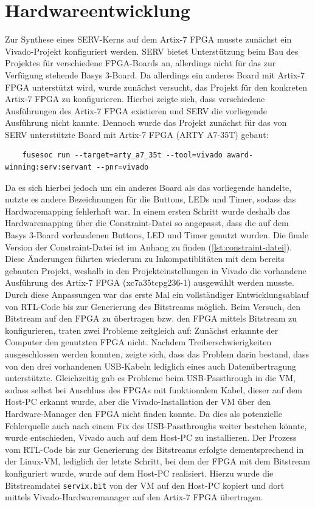 \section{Hardwareentwicklung} \label{sec:hardwareentwicklung}
    Zur Synthese eines SERV-Kerns auf dem Artix-7 FPGA musste zunächst ein Vivado-Projekt konfiguriert werden.
    SERV bietet Unterstützung beim Bau des Projektes für verschiedene FPGA-Boards an, allerdings nicht für das zur Verfügung stehende Basys 3-Board.
    Da allerdings ein anderes Board mit Artix-7 FPGA unterstützt wird, wurde zunächst versucht, das Projekt für den konkreten Artix-7 FPGA zu konfigurieren.
    Hierbei zeigte sich, dass verschiedene Ausführungen des Artix-7 FPGA existieren und SERV die vorliegende Ausführung nicht kannte.
    Dennoch wurde das Projekt zunächst für das von SERV unterstützte Board mit Artix-7 FPGA (ARTY A7-35T) gebaut:
    \begin{verbatim}
    fusesoc run --target=arty_a7_35t --tool=vivado award-winning:serv:servant --pnr=vivado
    \end{verbatim}
    Da es sich hierbei jedoch um ein anderes Board als das vorliegende handelte, nutzte es andere Bezeichnungen für die Buttons, LEDs und Timer, sodass das Hardwaremapping fehlerhaft war.
    In einem ersten Schritt wurde deshalb das Hardwaremapping über die Constraint-Datei so angepasst, dass die auf dem Basys 3-Board vorhandenen Buttons, LED und Timer genutzt wurden.
    Die finale Version der Constraint-Datei ist im Anhang zu finden (\cref{lst:constraint-datei}).
    Diese Änderungen führten wiederum zu Inkompatiblitäten mit dem bereits gebauten Projekt, weshalb in den Projekteinstellungen in Vivado die vorhandene Ausführung des Artix-7 FPGA (xc7a35tcpg236-1) ausgewählt werden musste.
    Durch diese Anpassungen war das erste Mal ein vollständiger Entwicklungsablauf von RTL-Code bis zur Generierung des Bitstreams möglich.
    Beim Versuch, den Bitstream auf den FPGA zu übertragen bzw. den FPGA mittels Bitstream zu konfigurieren, traten zwei Probleme zeitgleich auf:
    Zunächst erkannte der Computer den genutzten FPGA nicht.
    Nachdem Treiberschwierigkeiten ausgeschlossen werden konnten, zeigte sich, dass das Problem darin bestand, dass von den drei vorhandenen USB-Kabeln lediglich eines auch Datenübertragung unterstützte.
    Gleichzeitig gab es Probleme beim USB-Passthrough in die VM, sodass selbst bei Anschluss des FPGAs mit funktionalem Kabel, dieser auf dem Host-PC erkannt wurde, aber die Vivado-Installation der VM über den Hardware-Manager den FPGA nicht finden konnte.
    Da dies als potenzielle Fehlerquelle auch nach einem Fix des USB-Passthroughs weiter bestehen könnte, wurde entschieden, Vivado auch auf dem Host-PC zu installieren.
    Der Prozess vom RTL-Code bis zur Generierung des Bitstreams erfolgte dementsprechend in der Linux-VM, lediglich der letzte Schritt, bei dem der FPGA mit dem Bitstream konfiguriert wurde, wurde auf dem Host-PC realisiert.
    Hierzu wurde die Bitstreamdatei \verb|servix.bit| von der VM auf den Host-PC kopiert und dort mittels Vivado-Hardwaremanager auf den Artix-7 FPGA übertragen.

